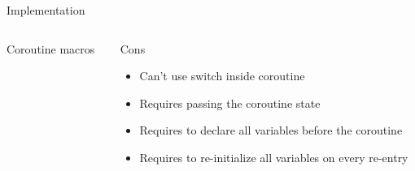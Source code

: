 \documentclass{beamer}
\begin{document}
\begin{frame}{ Implementation }
   \begin{columns}
      \begin{column}{0.5\textwidth}
         \begin{block}{Coroutine macros}
            \scalebox{0.8} {
               
            }
         \end{block}
      \end{column}
      \begin{column}{0.5\textwidth}
         \begin{block}{Cons}
            \begin{itemize}[<+->]
               \item Can't use switch inside coroutine
               \item Requires passing the coroutine state
               \item Requires to declare all variables before the coroutine
               \item Requires to re-initialize all variables on every re-entry
            \end{itemize}
         \end{block}
      \end{column}
   \end{columns}
\end{frame}
\end{document}
